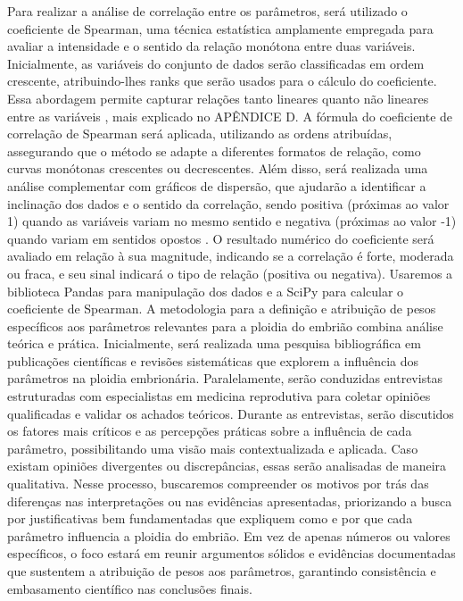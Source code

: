Para realizar a análise de correlação entre os parâmetros, será utilizado o coeficiente de Spearman, uma técnica estatística amplamente empregada para avaliar a intensidade e o sentido da relação monótona entre duas variáveis. Inicialmente, as variáveis do conjunto de dados serão classificadas em ordem crescente, atribuindo-lhes ranks que serão usados para o cálculo do coeficiente. Essa abordagem permite capturar relações tanto lineares quanto não lineares entre as variáveis \cite{sousa2019}, mais explicado no APÊNDICE D. A fórmula do coeficiente de correlação de Spearman será aplicada, utilizando as ordens atribuídas, assegurando que o método se adapte a diferentes formatos de relação, como curvas monótonas crescentes ou decrescentes. Além disso, será realizada uma análise complementar com gráficos de dispersão, que ajudarão a identificar a inclinação dos dados e o sentido da correlação, sendo positiva (próximas ao valor 1) quando as variáveis variam no mesmo sentido e negativa (próximas ao valor -1) quando variam em sentidos opostos \cite{sousa2019}. O resultado numérico do coeficiente será avaliado em relação à sua magnitude, indicando se a correlação é forte, moderada ou fraca, e seu sinal indicará o tipo de relação (positiva ou negativa). Usaremos a biblioteca Pandas para manipulação dos dados e a SciPy para calcular o coeficiente de Spearman. A metodologia para a definição e atribuição de pesos específicos aos parâmetros relevantes para a ploidia do embrião combina análise teórica e prática. Inicialmente, será realizada uma pesquisa bibliográfica em publicações científicas e revisões sistemáticas que explorem a influência dos parâmetros na ploidia embrionária. Paralelamente, serão conduzidas entrevistas estruturadas com especialistas em medicina reprodutiva para coletar opiniões qualificadas e validar os achados teóricos. Durante as entrevistas, serão discutidos os fatores mais críticos e as percepções práticas sobre a influência de cada parâmetro, possibilitando uma visão mais contextualizada e aplicada. Caso existam opiniões divergentes ou discrepâncias, essas serão analisadas de maneira qualitativa. Nesse processo, buscaremos compreender os motivos por trás das diferenças nas interpretações ou nas evidências apresentadas, priorizando a busca por justificativas bem fundamentadas que expliquem como e por que cada parâmetro influencia a ploidia do embrião. Em vez de apenas números ou valores específicos, o foco estará em reunir argumentos sólidos e evidências documentadas que sustentem a atribuição de pesos aos parâmetros, garantindo consistência e embasamento científico nas conclusões finais.

